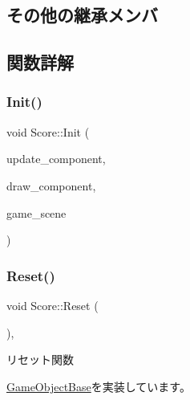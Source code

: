 \subsection*{その他の継承メンバ}


\subsection{関数詳解}
\mbox{\label{class_score_a7d461a8b72ddfd00213858286d702486}} 
\subsubsection{\texorpdfstring{Init()}{Init()}}
{\footnotesize\ttfamily void Score\+::\+Init (\begin{DoxyParamCaption}\item[{\mbox{\hyperlink{class_update_base}{Update\+Base}} $\ast$}]{update\+\_\+component,  }\item[{\mbox{\hyperlink{class_draw_base}{Draw\+Base}} $\ast$}]{draw\+\_\+component,  }\item[{\mbox{\hyperlink{class_game_scene}{Game\+Scene}} $\ast$}]{game\+\_\+scene }\end{DoxyParamCaption})}

\mbox{\label{class_score_ad01d461a2b6ca345858b2ae0a3d81cc1}} 
\subsubsection{\texorpdfstring{Reset()}{Reset()}}
{\footnotesize\ttfamily void Score\+::\+Reset (\begin{DoxyParamCaption}{ }\end{DoxyParamCaption})\hspace{0.3cm}{\ttfamily [override]}, {\ttfamily [virtual]}}



リセット関数 



\mbox{\hyperlink{class_game_object_base_a85c59554f734bcb09f1a1e18d9517dce}{Game\+Object\+Base}}を実装しています。

\mbox{\label{class_score_a605e163dc59ccc4d19a3cb6b5db813b8}} 
